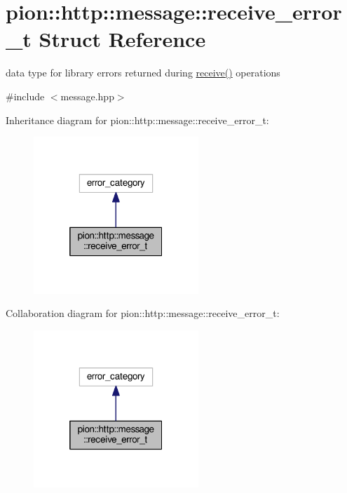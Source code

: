 \hypertarget{structpion_1_1http_1_1message_1_1receive__error__t}{\section{pion\-:\-:http\-:\-:message\-:\-:receive\-\_\-error\-\_\-t Struct Reference}
\label{structpion_1_1http_1_1message_1_1receive__error__t}
}


data type for library errors returned during \hyperlink{classpion_1_1http_1_1message_a7e3c3f1ea265f91b87a9e075234b5d31}{receive()} operations  




{\ttfamily \#include $<$message.\-hpp$>$}



Inheritance diagram for pion\-:\-:http\-:\-:message\-:\-:receive\-\_\-error\-\_\-t\-:
\nopagebreak
\begin{figure}[H]
\begin{center}
\leavevmode
\includegraphics[width=176pt]{structpion_1_1http_1_1message_1_1receive__error__t__inherit__graph}
\end{center}
\end{figure}


Collaboration diagram for pion\-:\-:http\-:\-:message\-:\-:receive\-\_\-error\-\_\-t\-:
\nopagebreak
\begin{figure}[H]
\begin{center}
\leavevmode
\includegraphics[width=176pt]{structpion_1_1http_1_1message_1_1receive__error__t__coll__graph}
\end{center}
\end{figure}
